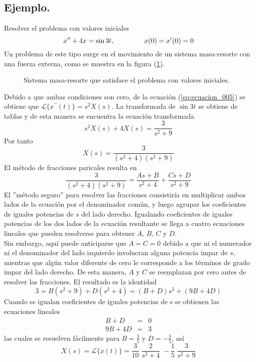 \subsection*{Ejemplo.}
Resolver el problema con valores iniciales
\[ x^{\prime \prime} + 4 x =  \sin 3t, \hspace{1.5cm} x(0) = x^{\prime}(0) = 0 \]
Un problema de este tipo surge en el movimiento de un sistema masa-resorte con una fuerza externa, como se muestra en la figura (\ref{fig:figura_002}).
\begin{figure}[H]
\centering

\label{fig:figura_002}
\caption{Sistema masa-resorte que satisface el problema con valores iniciales.}
\end{figure}
Debido a que ambas condiciones son cero, de la ecuación (\ref{eq:ecuacion_005}) se obtiene que $\mathscr{L} \{x^{\prime \prime} (t) \} = s^{2} X(s) $. La transformada de $\sin 3t$ se obtiene de tablas y de esta manera se encuentra la ecuación transformada
\[ s^{2} X(s) + 4 X(s) = \dfrac{3}{s^{2} + 9} \]
Por tanto
\[ X(s) = \dfrac{3}{(s^{2} + 4)(s^{2} + 9)} \]
El método de fracciones paricales resulta en
\[ \dfrac{3}{(s^{2} + 4)(s^{2} + 9)} = \dfrac{As + B}{s^{2} + 4} + \dfrac{Cs +D}{s^{2} + 9} \]
El ''método seguro'' para resolver las fracciones consistiría en multiplicar ambos lados de la ecuación por el denominador común, y luego agrupar los coeficientes de iguales potencias de $s$ del lado derecho. Igualando coeficientes de iguales potencias de los dos lados de la ecuación resultante se llega a cuatro ecuaciones lineales que pueden resolverse para obtener $A$, $B$, $C$ y $D$.
\\
Sin embargo, aquí puede anticiparse que $A = C = 0$ debido a que ni el numerador ni el denominador del lado izquierdo involucran alguna potencia impar de $s$, mientras que algún valor diferente de cero le corresponde a los términos de grado impar del lado derecho. De esta manera, $A$ y $C$ se reemplazan por cero antes de resolver las fracciones. El resultado es la identidad
\[ 3 = B (s^{2} + 9) + D (s^{2} +  4) =  (B + D)s^{2} + (9 B + 4 D) \]
Cuando se igualan coeficientes de iguales potencias de s se obtienen las ecuaciones lineales
\begin{eqnarray*}
B + D &=& 0 \nonumber \\
9B + 4D &=& 3
\end{eqnarray*}
las cuales se resuelven fácilmente para $B = \frac{3}{5}$ y $D = - \frac{3}{5}$, así
\[ X(s) = \mathscr{L} \{x(t) \} = \dfrac{3}{10} \; \dfrac{2}{s^{2} + 4} \; - \dfrac{1}{5} \; \dfrac{3}{s^{2} + 9} \]
